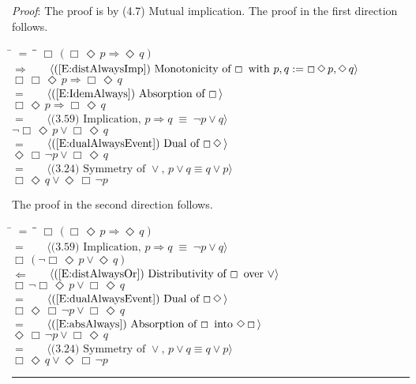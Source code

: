 \documentclass[12pt, fleqn, leqno]{article}
\newcommand{\lgap}{2pt}                             %
\newcommand{\mymathindent}{24pt}                    %
\newcommand{\equivs}{\ensuremath{\;\equiv\;}}       %
\newcommand{\impl}{\ensuremath{\Rightarrow}}        %
\newcommand{\foll}{\ensuremath{\Leftarrow}}         %
\newcommand{\Event}{\Diamond\,}
\newcommand{\Always}{\Box\,}
\newcommand{\myqed}{\rule[-.23ex]{1.2ex}{2.0ex}}
\newcommand{\myqedtab}{\hspace{384pt}}              %
\newcommand{\Gll} {\langle}                         %
\newcommand{\Ggg} {\rangle}                         %
\newcommand{\Hint}[1]     {\ \ \ $\Gll              \mbox{#1} \Ggg$ }   %
\begin{document}
\emph{Proof}: The proof is by (4.7) Mutual implication.
The proof in the first direction follows.
\begin{tabbing}
\hspace{\mymathindent} \= $= \;$ \= \myqedtab \= \kill
  \> \>   $\Always (\Always\Event p \impl \Event q)$\\[\lgap]
  \> $\impl$  \>  \Hint{(\ref{E:distAlwaysImp}) Monotonicity of $\Always$ with $p,q := \Always\Event p, \Event q$}\\[\lgap]
  \> \>   $\Always\Always\Event p \impl \Always\Event q$\\[\lgap]
   \> $=$  \>  \Hint{(\ref{E:IdemAlways}) Absorption of $\Always$}\\[\lgap]
 \> \>   $\Always\Event p \impl \Always\Event q$\\[\lgap]
 \> $=$  \>  \Hint{(3.59) Implication, $p\impl q \equivs \neg p \lor q$}\\[\lgap]
 \> \>   $\neg\Always\Event p \lor \Always\Event q$\\[\lgap]
  \> $=$  \>  \Hint{(\ref{E:dualAlwaysEvent}) Dual of $\Always \Event$}\\[\lgap]
  \> \>   $\Event\Always\neg p \lor \Always\Event q$\\[\lgap]
 \> $=$  \>  \Hint{(3.24) Symmetry of $\lor$, $p\lor q \equiv q\lor p$}\\[\lgap]
  \> \>   $ \Always\Event q \lor \Event\Always\neg p $
\end{tabbing}
The proof in the second direction follows.
\begin{tabbing}
\hspace{\mymathindent} \= $= \;$ \= \myqedtab \= \kill
 \> \>   $\Always (\Always\Event p \impl \Event q)$\\[\lgap]
 \> $=$  \>  \Hint{(3.59) Implication, $p\impl q \equivs \neg p \lor q$}\\[\lgap]
 \> \>   $\Always (\neg\Always\Event p \lor \Event q)$\\[\lgap]
  \> $\foll$  \>  \Hint{(\ref{E:distAlwaysOr}) Distributivity of $\Always$ over $\lor$}\\[\lgap]
  \> \>   $\Always\neg\Always\Event p \lor \Always\Event q$\\[\lgap]
   \> $=$  \>  \Hint{(\ref{E:dualAlwaysEvent}) Dual of $\Always \Event$}\\[\lgap]
 \> \>   $\Always\Event\Always\neg p \lor \Always\Event q$\\[\lgap]
  \> $=$  \>  \Hint{(\ref{E:absAlways}) Absorption of $\Always$ into $\Event\Always$}\\[\lgap]
  \> \>   $\Event\Always\neg p \lor \Always\Event q$\\[\lgap]
 \> $=$  \>  \Hint{(3.24) Symmetry of $\lor$, $p\lor q \equiv q\lor p$}\\[\lgap]
  \> \>   $ \Always\Event q \lor \Event\Always\neg p $ \quad \myqed
\end{tabbing}
\end{document}
